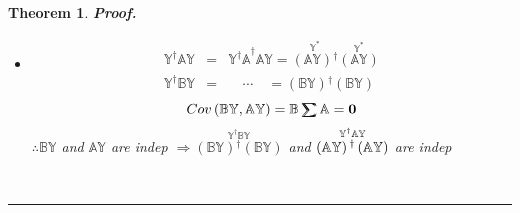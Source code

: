 \documentclass{article}
\newtheorem{theorem}{Theorem}
\newenvironment{proof}[1][Proof]{\noindent\textbf{#1.} }{\ \rule{0.5em}{0.5em}}
\begin{document}
\begin{theorem}
\begin{proof}
\begin{itemize}
\item[Case 2] 
\begin{eqnarray*}
\mathbb{Y^{\dagger }AY} &=&\mathbb{Y^{\dagger }A}^{\dagger }\mathbb{AY}=%
\overset{\mathbb{Y}^{\ast }}{\left( \mathbb{AY}\right) \mathbb{^{\dagger }}}%
\overset{\mathbb{Y}^{\ast }}{\left( \mathbb{AY}\right) } \\
\mathbb{Y^{\dagger }BY} &=&\quad \mathbb{\cdots }\quad =\left( \mathbb{BY}%
\right) \mathbb{^{\dagger }}\left( \mathbb{BY}\right)
\end{eqnarray*}%
\begin{equation*}
Cov\left( \mathbb{BY},\mathbb{AY}\right) =\mathbb{B}%
\tsum\mkern-20mu\tsum%
\mathbb{A}=\boldsymbol{0}
\end{equation*}%
$\therefore \mathbb{BY}$ and $\mathbb{AY}$ are indep\newline
\newline
$\Rightarrow \overset{\mathbb{Y^{\dagger }BY}}{\left( \mathbb{BY}\right) 
\mathbb{^{\dagger }}\left( \mathbb{BY}\right) }$ and $\overset{\mathbb{%
Y^{\dagger }AY}}{\left( \mathbb{AY}\right) \mathbb{^{\dagger }}\left( 
\mathbb{AY}\right) }$ are indep
\end{itemize}
\end{proof}
\end{theorem}

\bigskip
\end{document}

